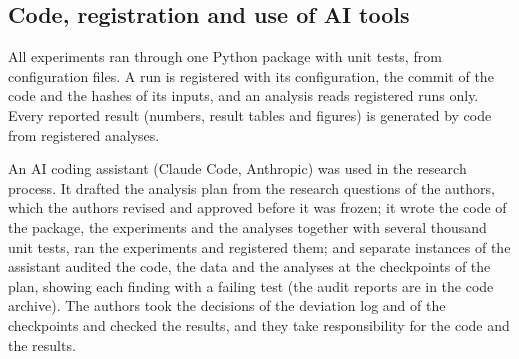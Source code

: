 \subsection{Code, registration and use of AI tools}\label{sec:code}

All experiments ran through one Python package with unit tests, from configuration files. A run is registered with
its configuration, the commit of the code and the hashes of its inputs, and an analysis reads registered runs only.
Every reported result (numbers, result tables and figures) is generated by code from registered analyses.

An AI coding assistant (Claude Code, Anthropic) was used in the research process. It drafted the analysis plan from
the research questions of the authors, which the authors revised and approved before it was frozen; it wrote the code
of the package, the experiments and the analyses together with several thousand unit tests, ran the experiments and
registered them; and separate instances of the assistant audited the code, the data and the analyses at the
checkpoints of the plan, showing each finding with a failing test (the audit reports are in the code archive). The
authors took the decisions of the deviation log and of the checkpoints and checked the results, and they take
responsibility for the code and the results.
